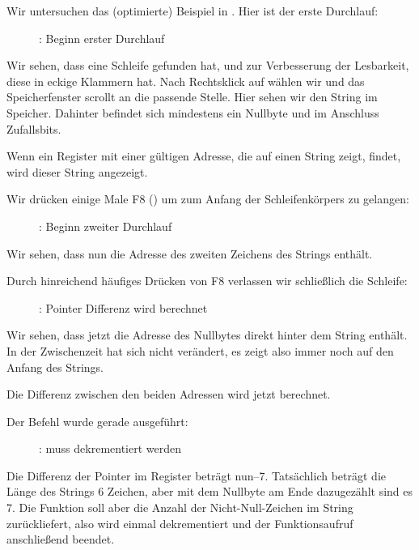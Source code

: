 \clearpage
{}
\myindex{\olly}

Wir untersuchen das (optimierte) Beispiel in \olly. Hier ist der erste
Durchlauf:

\begin{figure}[H]
\centering
{}
\caption{\olly: Beginn erster Durchlauf}
\label{fig:strlen_olly_1}
\end{figure}

Wir sehen, dass \olly eine Schleife gefunden hat, und zur Verbesserung der
Lesbarkeit, diese in eckige Klammern  hat.
Nach Rechtsklick auf \EAX wählen wir  und das Speicherfenster
scrollt an die passende Stelle. 
Hier sehen wir den String  im Speicher. 
Dahinter befindet sich mindestens ein Nullbyte und im Anschluss Zufallsbits.

Wenn \olly ein Register mit einer gültigen Adresse, die auf einen String zeigt,
findet, wird dieser String angezeigt.

\clearpage
Wir drücken einige Male F8 (\stepover) um zum Anfang der Schleifenkörpers zu
gelangen:

\begin{figure}[H]
\centering
{}
\caption{\olly: Beginn zweiter Durchlauf}
\label{fig:strlen_olly_2}
\end{figure}

Wir sehen, dass \EAX nun die Adresse des zweiten Zeichens des Strings enthält.

\clearpage

Durch hinreichend häufiges Drücken von F8 verlassen wir schließlich die
Schleife:

\begin{figure}[H]
\centering
{}
\caption{\olly: Pointer Differenz wird berechnet}
\label{fig:strlen_olly_3}
\end{figure}

Wir sehen, dass \EAX jetzt die Adresse des Nullbytes direkt hinter dem String
enthält. In der Zwischenzeit hat sich \EDX nicht verändert, es zeigt also immer
noch auf den Anfang des Strings. 

Die Differenz zwischen den beiden Adressen wird jetzt berechnet. 

\clearpage
Der \SUB Befehl wurde gerade ausgeführt:

\begin{figure}[H]
\centering
{}
\caption{\olly: \EAX muss dekrementiert werden}
\label{fig:strlen_olly_4}
\end{figure}

Die Differenz der Pointer im \EAX Register beträgt nun--7.
Tatsächlich beträgt die Länge des  Strings 6 Zeichen, aber mit dem
Nullbyte am Ende dazugezählt sind es 7.
Die Funktion  soll aber die Anzahl der Nicht-Null-Zeichen im String
zurückliefert, also wird einmal dekrementiert und der Funktionsaufruf
anschließend beendet.
